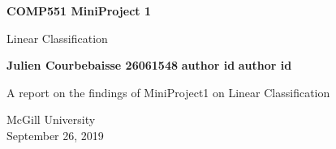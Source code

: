 \documentclass[11pt]{article}
\begin{document}
\begin{center}
       \vspace*{1cm}
 
       \textbf{\huge COMP551 MiniProject 1}
 
       \vspace{0.5cm}
        Linear Classification
 
       \vspace{1.5cm}
 
       \textbf{Julien Courbebaisse 26061548} \linebreak
	\textbf{author id}\linebreak
	\textbf{author id}
 
       \vfill
 
       A report on the findings of MiniProject1 on Linear Classification
 
       \vspace{0.8cm}
 
 
       McGill University\\
       September 26, 2019
\end{center}
\end{document}
